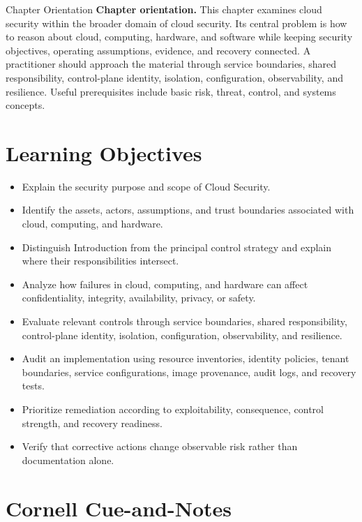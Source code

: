 \documentclass[11pt,letterpaper]{article}
\title{\CornellDocumentTitle}
\author{}
\date{}
\begin{document}
\maketitle
\begin{CornellOverviewBox}{Chapter Orientation}
\textbf{Chapter orientation.} This chapter examines cloud security within the broader domain of cloud security. Its central problem is how to reason about cloud, computing, hardware, and software while keeping security objectives, operating assumptions, evidence, and recovery connected. A practitioner should approach the material through service boundaries, shared responsibility, control-plane identity, isolation, configuration, observability, and resilience. Useful prerequisites include basic risk, threat, control, and systems concepts.
\end{CornellOverviewBox}
\section*{Learning Objectives}
\begin{itemize}
\item Explain the security purpose and scope of Cloud Security.
\item Identify the assets, actors, assumptions, and trust boundaries associated with cloud, computing, and hardware.
\item Distinguish Introduction from the principal control strategy and explain where their responsibilities intersect.
\item Analyze how failures in cloud, computing, and hardware can affect confidentiality, integrity, availability, privacy, or safety.
\item Evaluate relevant controls through service boundaries, shared responsibility, control-plane identity, isolation, configuration, observability, and resilience.
\item Audit an implementation using resource inventories, identity policies, tenant boundaries, service configurations, image provenance, audit logs, and recovery tests.
\item Prioritize remediation according to exploitability, consequence, control strength, and recovery readiness.
\item Verify that corrective actions change observable risk rather than documentation alone.
\end{itemize}
\section*{Cornell Cue-and-Notes}
\end{document}
